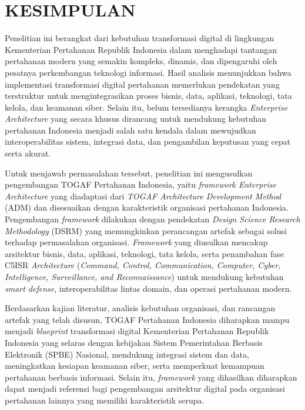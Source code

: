 \cleardoublepage
\chapter{KESIMPULAN}
\label{chap:kesimpulan}

Penelitian ini berangkat dari kebutuhan transformasi digital di lingkungan Kementerian Pertahanan Republik Indonesia dalam menghadapi tantangan pertahanan modern yang semakin kompleks, dinamis, dan dipengaruhi oleh pesatnya perkembangan teknologi informasi.
Hasil analisis menunjukkan bahwa implementasi transformasi digital pertahanan memerlukan pendekatan yang terstruktur untuk mengintegrasikan proses bisnis, data, aplikasi, teknologi, tata kelola, dan keamanan siber.
Selain itu, belum tersedianya kerangka \textit{Enterprise Architecture} yang secara khusus dirancang untuk mendukung kebutuhan pertahanan Indonesia menjadi salah satu kendala dalam mewujudkan interoperabilitas sistem, integrasi data, dan pengambilan keputusan yang cepat serta akurat.

Untuk menjawab permasalahan tersebut, penelitian ini mengusulkan pengembangan TOGAF Pertahanan Indonesia, yaitu \textit{framework Enterprise Architecture} yang diadaptasi dari \textit{TOGAF Architecture Development Method} (ADM) dan disesuaikan dengan karakteristik organisasi pertahanan Indonesia.
Pengembangan \textit{framework} dilakukan dengan pendekatan \textit{Design Science Research Methodology} (DSRM) yang memungkinkan perancangan artefak sebagai solusi terhadap permasalahan organisasi.
\textit{Framework} yang diusulkan mencakup arsitektur bisnis, data, aplikasi, teknologi, tata kelola, serta penambahan fase C5ISR \textit{Architecture} (\textit{Command, Control, Communication, Computer, Cyber, Intelligence, Surveillance, and Reconnaissance}) untuk mendukung kebutuhan \textit{smart defense}, interoperabilitas lintas domain, dan operasi pertahanan modern.

Berdasarkan kajian literatur, analisis kebutuhan organisasi, dan rancangan artefak yang telah disusun, TOGAF Pertahanan Indonesia diharapkan mampu menjadi \textit{blueprint} transformasi digital Kementerian Pertahanan Republik Indonesia yang selaras dengan kebijakan Sistem Pemerintahan Berbasis Elektronik (SPBE) Nasional, mendukung integrasi sistem dan data, meningkatkan kesiapan keamanan siber, serta memperkuat kemampuan pertahanan berbasis informasi.
Selain itu, \textit{framework} yang dihasilkan diharapkan dapat menjadi referensi bagi pengembangan arsitektur digital pada organisasi pertahanan lainnya yang memiliki karakteristik serupa.

